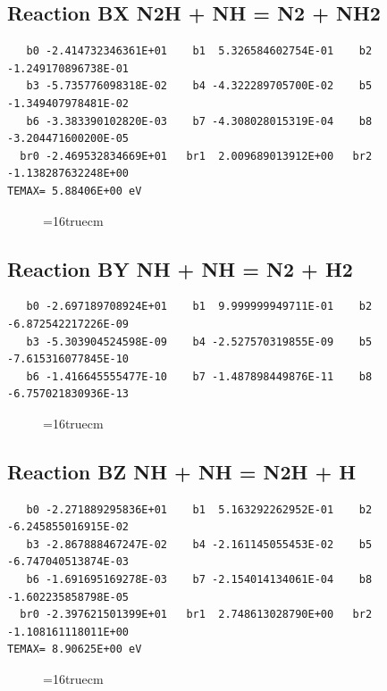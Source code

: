 \documentclass[12pt,dvipdfm]{article}
\begin{document}
\subsection{
Reaction BX N2H + NH = N2 + NH2 }
\begin{small}\begin{verbatim}
   b0 -2.414732346361E+01    b1  5.326584602754E-01    b2 -1.249170896738E-01
   b3 -5.735776098318E-02    b4 -4.322289705700E-02    b5 -1.349407978481E-02
   b6 -3.383390102820E-03    b7 -4.308028015319E-04    b8 -3.204471600200E-05
  br0 -2.469532834669E+01   br1  2.009689013912E+00   br2 -1.138287632248E+00
TEMAX= 5.88406E+00 eV
   \end{verbatim}\end{small}
\begin{figure}[h!]
\label{n2rates}
\epsfxsize=16truecm
\end{figure}
\newpage

\subsection{
Reaction BY NH + NH = N2 + H2 }
\begin{small}\begin{verbatim}
   b0 -2.697189708924E+01    b1  9.999999949711E-01    b2 -6.872542217226E-09
   b3 -5.303904524598E-09    b4 -2.527570319855E-09    b5 -7.615316077845E-10
   b6 -1.416645555477E-10    b7 -1.487898449876E-11    b8 -6.757021830936E-13
   \end{verbatim}\end{small}
\begin{figure}[h!]
\label{n2rates}
\epsfxsize=16truecm
\end{figure}
\newpage

\subsection{
Reaction BZ NH + NH = N2H + H }
\begin{small}\begin{verbatim}
   b0 -2.271889295836E+01    b1  5.163292262952E-01    b2 -6.245855016915E-02
   b3 -2.867888467247E-02    b4 -2.161145055453E-02    b5 -6.747040513874E-03
   b6 -1.691695169278E-03    b7 -2.154014134061E-04    b8 -1.602235858798E-05
  br0 -2.397621501399E+01   br1  2.748613028790E+00   br2 -1.108161118011E+00
TEMAX= 8.90625E+00 eV
   \end{verbatim}\end{small}
\begin{figure}[h!]
\label{n2rates}
\epsfxsize=16truecm
\end{figure}
\newpage
\end{document}
